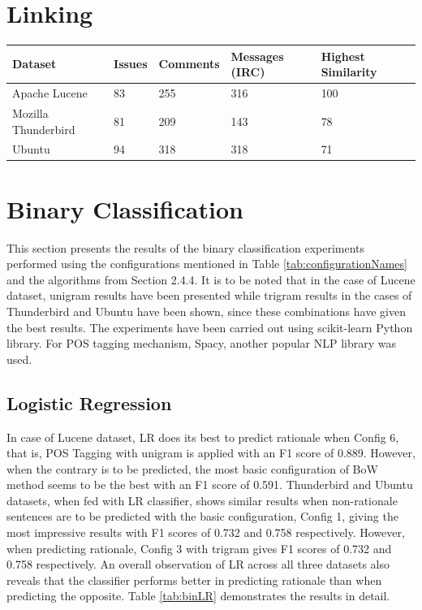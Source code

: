 \documentclass[a4paper,12pt,twoside]{report}
\begin{document}
\section{Linking}
\begin{table} %
    \centering
    \begin{adjustbox}{max width=\columnwidth}
    \def\arraystretch{1} %
    \begin{tabular}{p{4cm} p{3cm} p{3cm} p{4cm} p{4cm}}
        \toprule
        \textbf{Dataset} & \textbf{Issues} & \textbf{Comments} & \textbf{Messages (IRC)} & \textbf{Highest Similarity}\\
        \midrule
			Apache Lucene & 83 & 255 & 316 & 100 \\
			Mozilla Thunderbird & 81 & 209 & 143 & 78 \\ 
			Ubuntu & 94 & 318 & 318 & 71 \\
        \midrule
    \end{tabular}
    \end{adjustbox}
    \label{tab:topicLinking}
\end{table}

\section{Binary Classification}
This section presents the results of the binary classification experiments performed using the configurations mentioned in Table \ref{tab:configurationNames} and the algorithms from Section 2.4.4. It is to be noted that in the case of Lucene dataset, unigram results have been presented while trigram results in the cases of Thunderbird and Ubuntu have been shown, since these combinations have given the best results. The experiments have been carried out using scikit-learn Python library. For POS tagging mechanism, Spacy, another popular NLP library was used. 

\subsection{Logistic Regression}
In case of Lucene dataset, LR does its best to predict rationale when Config 6, that is, POS Tagging with unigram is applied with an F1 score of 0.889. However, when the contrary is to be predicted, the most basic configuration of BoW method seems to be the best with an F1 score of 0.591. Thunderbird and Ubuntu datasets, when fed with LR classifier, shows similar results when non-rationale sentences are to be predicted with the basic configuration, Config 1, giving the most impressive results with F1 scores of 0.732 and 0.758 respectively. However, when predicting rationale, Config 3 with trigram gives F1 scores of 0.732 and 0.758 respectively. An overall observation of LR across all three datasets also reveals that the classifier performs better in predicting rationale than when predicting the opposite. Table \ref{tab:binLR} demonstrates the results in detail. 
\end{document}
